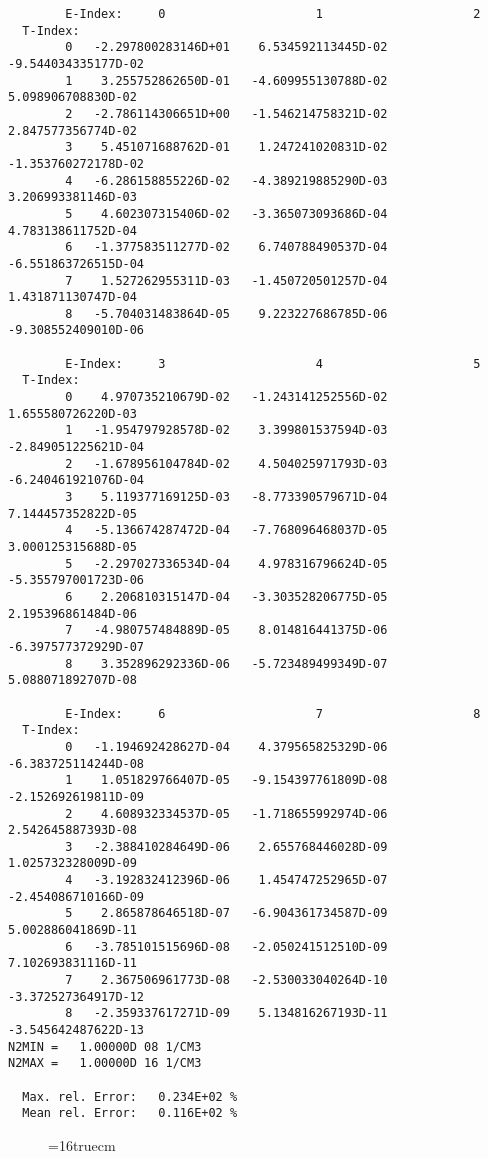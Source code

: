 \documentclass[12pt,dvipdfmx]{article}
\begin{document}
\begin{small}\begin{verbatim}
        E-Index:     0                     1                     2
  T-Index:
        0   -2.297800283146D+01    6.534592113445D-02   -9.544034335177D-02
        1    3.255752862650D-01   -4.609955130788D-02    5.098906708830D-02
        2   -2.786114306651D+00   -1.546214758321D-02    2.847577356774D-02
        3    5.451071688762D-01    1.247241020831D-02   -1.353760272178D-02
        4   -6.286158855226D-02   -4.389219885290D-03    3.206993381146D-03
        5    4.602307315406D-02   -3.365073093686D-04    4.783138611752D-04
        6   -1.377583511277D-02    6.740788490537D-04   -6.551863726515D-04
        7    1.527262955311D-03   -1.450720501257D-04    1.431871130747D-04
        8   -5.704031483864D-05    9.223227686785D-06   -9.308552409010D-06

        E-Index:     3                     4                     5
  T-Index:
        0    4.970735210679D-02   -1.243141252556D-02    1.655580726220D-03
        1   -1.954797928578D-02    3.399801537594D-03   -2.849051225621D-04
        2   -1.678956104784D-02    4.504025971793D-03   -6.240461921076D-04
        3    5.119377169125D-03   -8.773390579671D-04    7.144457352822D-05
        4   -5.136674287472D-04   -7.768096468037D-05    3.000125315688D-05
        5   -2.297027336534D-04    4.978316796624D-05   -5.355797001723D-06
        6    2.206810315147D-04   -3.303528206775D-05    2.195396861484D-06
        7   -4.980757484889D-05    8.014816441375D-06   -6.397577372929D-07
        8    3.352896292336D-06   -5.723489499349D-07    5.088071892707D-08

        E-Index:     6                     7                     8
  T-Index:
        0   -1.194692428627D-04    4.379565825329D-06   -6.383725114244D-08
        1    1.051829766407D-05   -9.154397761809D-08   -2.152692619811D-09
        2    4.608932334537D-05   -1.718655992974D-06    2.542645887393D-08
        3   -2.388410284649D-06    2.655768446028D-09    1.025732328009D-09
        4   -3.192832412396D-06    1.454747252965D-07   -2.454086710166D-09
        5    2.865878646518D-07   -6.904361734587D-09    5.002886041869D-11
        6   -3.785101515696D-08   -2.050241512510D-09    7.102693831116D-11
        7    2.367506961773D-08   -2.530033040264D-10   -3.372527364917D-12
        8   -2.359337617271D-09    5.134816267193D-11   -3.545642487622D-13
N2MIN =   1.00000D 08 1/CM3
N2MAX =   1.00000D 16 1/CM3

  Max. rel. Error:   0.234E+02 %
  Mean rel. Error:   0.116E+02 %

\end{verbatim}\end{small}
\begin{figure} \label{2.2.17mar}
\epsfxsize=16truecm
\end{figure}
\newpage
\end{document}

